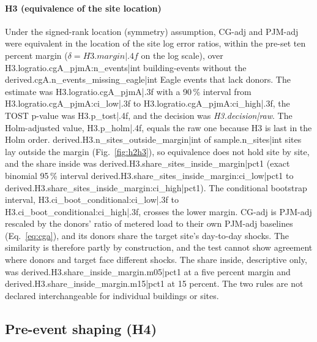 \paragraph{H3 (equivalence of the site location)}Under the signed-rank location (symmetry) assumption, CG-adj and PJM-adj were equivalent in the location of the site log error ratios, within the pre-set ten percent margin ($\delta={{H3.margin|.4f}}$ on the log scale), over {{H3.logratio.cgA_pjmA:n_events|int}} building-events without the {{derived.cgA.n_events_missing_eagle|int}} Eagle events that lack donors. The estimate was {{H3.logratio.cgA_pjmA|.3f}} with a 90\,\% interval from {{H3.logratio.cgA_pjmA:ci_low|.3f}} to {{H3.logratio.cgA_pjmA:ci_high|.3f}}, the TOST p-value was {{H3.p_tost|.4f}}, and the decision was \emph{{{H3.decision|raw}}}. The Holm-adjusted value, {{H3.p_holm|.4f}}, equals the raw one because H3 is last in the Holm order. {{derived.H3.n_sites_outside_margin|int}} of {{sample.n_sites|int}} sites lay outside the margin (Fig.~\ref{fig:h2h3}), so equivalence does not hold site by site, and the share inside was {{derived.H3.share_sites_inside_margin|pct1}} (exact binomial 95\,\% interval {{derived.H3.share_sites_inside_margin:ci_low|pct1}} to {{derived.H3.share_sites_inside_margin:ci_high|pct1}}). The conditional bootstrap interval, {{H3.ci_boot_conditional:ci_low|.3f}} to {{H3.ci_boot_conditional:ci_high|.3f}}, crosses the lower margin. CG-adj is PJM-adj rescaled by the donors' ratio of metered load to their own PJM-adj baselines (Eq.~\eqref{eq:cga}), and its donors share the target site's day-to-day shocks. The similarity is therefore partly by construction, and the test cannot show agreement where donors and target face different shocks. The share inside, descriptive only, was {{derived.H3.share_inside_margin.m05|pct1}} at a five percent margin and {{derived.H3.share_inside_margin.m15|pct1}} at 15 percent. The two rules are not declared interchangeable for individual buildings or sites.

\subsection{Pre-event shaping (H4)}\label{sec:results:h4}

